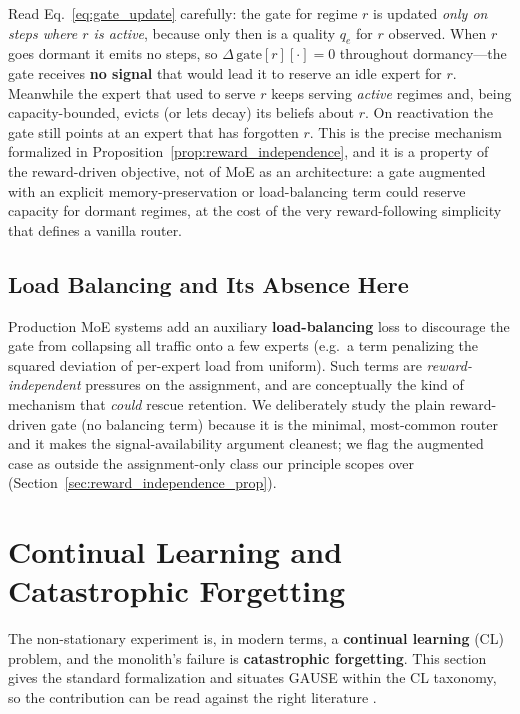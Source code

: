 \documentclass[11pt,a4paper]{article}
\theoremstyle{definition}
\theoremstyle{plain}
\begin{document}
\begin{keypoint}
Read Eq.~\eqref{eq:gate_update} carefully: the gate for regime $r$ is updated
\emph{only on steps where $r$ is active}, because only then is a quality
$q_{e}$ for $r$ observed. When $r$ goes dormant it emits no steps, so
$\Delta\,\mathrm{gate}[r][\cdot] = 0$ throughout dormancy---the gate receives
\textbf{no signal} that would lead it to reserve an idle expert for $r$. Meanwhile
the expert that used to serve $r$ keeps serving \emph{active} regimes and, being
capacity-bounded, evicts (or lets decay) its beliefs about $r$. On reactivation
the gate still points at an expert that has forgotten $r$. This is the precise
mechanism formalized in Proposition~\ref{prop:reward_independence}, and it is a
property of the reward-driven objective, not of MoE as an architecture: a gate
augmented with an explicit memory-preservation or load-balancing term could
reserve capacity for dormant regimes, at the cost of the very reward-following
simplicity that defines a vanilla router.
\end{keypoint}

\subsection{Load Balancing and Its Absence Here}

Production MoE systems add an auxiliary \textbf{load-balancing} loss to discourage
the gate from collapsing all traffic onto a few experts (e.g.\ a term penalizing
the squared deviation of per-expert load from uniform). Such terms are
\emph{reward-independent} pressures on the assignment, and are conceptually the
kind of mechanism that \emph{could} rescue retention. We deliberately study the
plain reward-driven gate (no balancing term) because it is the minimal,
most-common router and it makes the signal-availability argument cleanest; we
flag the augmented case as outside the assignment-only class our principle scopes
over (Section~\ref{sec:reward_independence_prop}).

\section{Continual Learning and Catastrophic Forgetting}
\label{sec:continual_learning}

The non-stationary experiment is, in modern terms, a \textbf{continual learning}
(CL) problem, and the monolith's failure is \textbf{catastrophic forgetting}. This
section gives the standard formalization and situates GAUSE within the CL
taxonomy, so the contribution can be read against the right literature
\cite{french1999catastrophic, kirkpatrick2017overcoming, parisi2019continual}.
\end{document}
